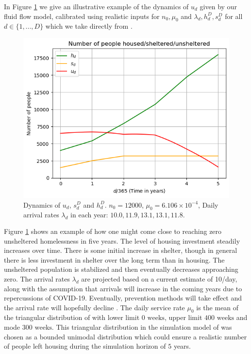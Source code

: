 \documentclass[12pt,a4paper]{article}
\begin{document}
In Figure \ref{fig:ut-illustrative} we give an illustrative example of the dynamics of $u_d$ given by our fluid flow model, calibrated using realistic inputs for $n_0, \mu_0$ and $\lambda_d, h^D_d, s^D_d$ for all $d \in \{1,...,D\}$ which we take directly from \cite{singham2023discrete}. 
%
\begin{figure}[h!]%
    \centering
    \includegraphics[scale=0.8]{u_t_example.png}
    \caption{Dynamics of $u_d$, $s^D_d$ and $h^D_d$. $n_0 = 12000$, $\mu_0 = 6.106 \times 10^{-4}$, Daily arrival rates $\lambda_d$ in each year: $10.0,11.9,13.1,13.1,11.8$.}
    \label{fig:ut-illustrative}
\end{figure}
%
Figure \ref{fig:ut-illustrative} shows an example of how one might come close to reaching zero unsheltered homelessness in five years.  The level of housing investment steadily increases over time.  There is some initial increase in shelter, though in general there is less investment in shelter over the long term than in housing.  The unsheltered population is stabilized and then eventually decreases approaching zero.  The arrival rates $\lambda_d$ are projected based on a current estimate of 10/day, along with the assumption that arrivals will increase in the coming years due to repercussions of COVID-19.  Eventually, prevention methods will take effect and the arrival rate will hopefully decline \citep{hometogether2022}. The daily service rate $\mu_0$ is the mean of the triangular distribution of \cite{singham2023discrete} with lower limit $0 \text{ weeks}$, upper limit $400 \text{ weeks}$ and mode $300 \text{ weeks}$. This triangular distribution in the simulation model of \cite{singham2023discrete} was chosen as a bounded unimodal distribution which could ensure a realistic number of people left housing during the simulation horizon of $5$ years. 
\end{document}
